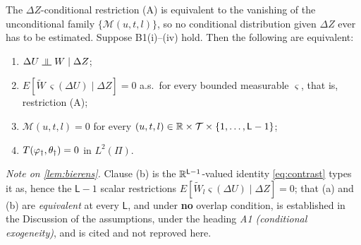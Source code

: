 \begin{lemma}\label{lem:bierens}
The $\Delta Z$-conditional restriction (A) is equivalent to the vanishing of the unconditional family
$\{\mathcal M(u,t,l)\}$, so no conditional distribution given $\Delta Z$ ever has to be estimated.
Suppose B1(i)--(iv) hold. Then the following are equivalent:
\begin{enumerate}
\item[(a)] $\Delta U\upmodels W\mid\Delta Z$;
\item[(b)] $E[\widetilde W\,\varsigma(\Delta U)\mid\Delta Z]=0$ a.s.\ for every bounded measurable $\varsigma$, that is, restriction \textup{(A)};
\item[(c)] $\mathcal M(u,t,l)=0$ for every $(u,t,l)\in\mathbb{R}\times\mathcal T\times\{1,\dots,\mathsf L-1\}$;
\item[(d)] $T(\varphi_{\dagger},\theta_\dagger)=0$ in $L^{2}(\Pi)$.
\end{enumerate}
\end{lemma}

\noindent\emph{Note on \cref{lem:bierens}.} Clause \textup{(b)} is the $\mathbb{R}^{\mathsf L-1}$-valued
identity \eqref{eq:contrast} types it as, hence the $\mathsf L-1$ scalar restrictions
$E[\widetilde W_l\varsigma(\Delta U)\mid\Delta Z]=0$; that \textup{(a)} and \textup{(b)} are
\emph{equivalent} at every $\mathsf L$, and under \textbf{no} overlap condition, is established in the
Discussion of the assumptions, under the heading \emph{A1 (conditional exogeneity)}, and is cited and
not reproved here.

